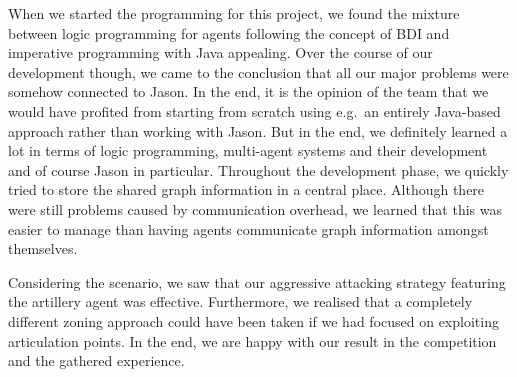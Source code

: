 When we started the programming for this project, we found the mixture between logic programming for agents following the concept of BDI and imperative programming with Java appealing.
Over the course of our development though, we came to the conclusion that all our major problems were somehow connected to Jason.
In the end, it is the opinion of the team that we  would have profited from starting from scratch using e.g.\ an entirely Java-based approach rather than working with Jason.
But in the end, we definitely learned a lot in terms of logic programming, multi-agent systems and their development and of course Jason in particular.
Throughout the development phase, we quickly tried to store the shared graph information in a central place.
Although there were still problems caused by communication overhead, we learned that this was easier to manage than having agents communicate graph information amongst themselves.

Considering the \mars{} scenario, we saw that our aggressive attacking strategy featuring the artillery agent was effective.
Furthermore, we realised that a completely different zoning approach could have been taken if we had focused on exploiting articulation points.
In the end, we are happy with our result in the competition and the gathered experience.
